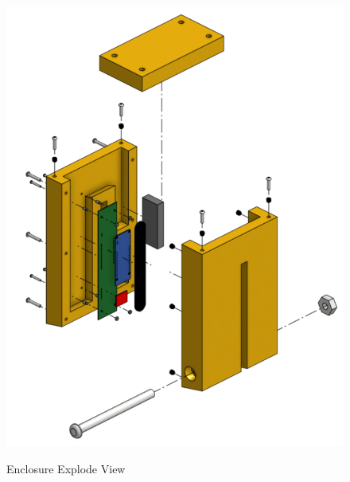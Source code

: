 \begin{figure}[H]
	\centering
	\caption{Enclosure Explode View}	
	\includegraphics[scale=0.42]{Sections/Design-Process/enclosure-explode.png}
	\label{enclosure-explode}
\end{figure}
\clearpage 
